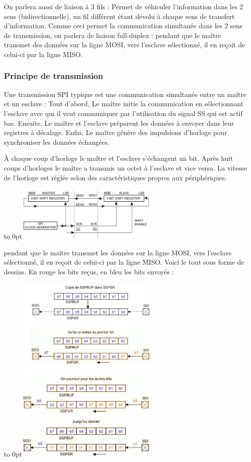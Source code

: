 \documentclass[french,a4paper,12pt]{report}
\begin{document}
	On parlera aussi de liaison à 3 fils : Permet de véhiculer l’information dans les 2 sens (bidirectionnelle), un fil différent étant dévolu à chaque sens de transfert d’information. Comme ceci permet la communication simultanée dans les 2 sens de transmission, on parlera de liaison full-duplex :
pendant que le maître transmet des données sur la ligne MOSI, vers l’esclave sélectionné, il en reçoit de celui-ci par la ligne MISO.

  		\subsubsection{Principe de transmission}
  		
			Une transmission SPI typique est une communication simultanée entre un maître et un esclave :
Tout d'abord, Le maître initie la communication en sélectionnant l'esclave avec qui il veut communiquer par l'utilisation du signal SS qui est actif bas.
Ensuite, Le maître et l'esclave préparent les données à envoyer dans leur registres à décalage.
Enfin, Le maître génère des impulsions d'horloge pour synchroniser les données échangées.
 
À chaque coup d'horloge le maître et l'esclave s'échangent un bit. Après huit coups d'horloges le maître a transmis un octet à l'esclave et vice versa. La vitesse de l'horloge est réglée selon des caractéristiques propres aux périphériques.
 
\hfill\hbox to 0pt{\hss\includegraphics[width=7cm]{SPI3.png}\hss}\hfill\null\newline
 
pendant que le maître transmet les données sur la ligne MOSI, vers l’esclave sélectionné, il en reçoit de celui-ci par la ligne MISO.
Voici le tout sous forme de dessins. En rouge les bits reçus, en bleu les bits envoyés :
 
\hfill\hbox to 0pt{\hss\includegraphics[width=7cm]{SPI4.png}\hss}\hfill\null\newline
 
\end{document}
